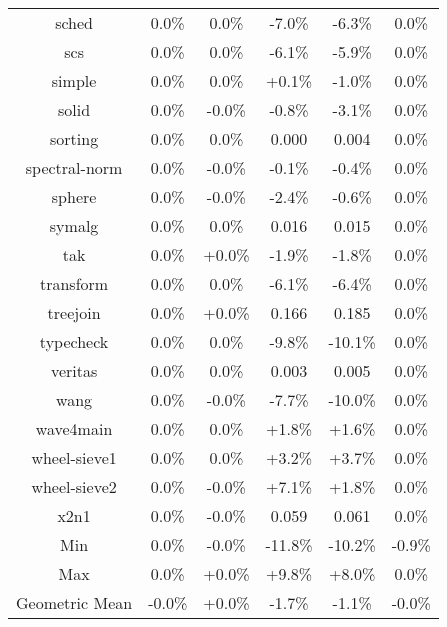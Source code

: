 \begin{tabular}{ c c c c c c }
sched &  0.0\% &  0.0\% & -7.0\% & -6.3\% &  0.0\%\\
scs &  0.0\% &  0.0\% & -6.1\% & -5.9\% &  0.0\%\\
simple &  0.0\% &  0.0\% & +0.1\% & -1.0\% &  0.0\%\\
solid &  0.0\% & -0.0\% & -0.8\% & -3.1\% &  0.0\%\\
sorting &  0.0\% &  0.0\% & 0.000 & 0.004 &  0.0\%\\
spectral-norm &  0.0\% & -0.0\% & -0.1\% & -0.4\% &  0.0\%\\
sphere &  0.0\% & -0.0\% & -2.4\% & -0.6\% &  0.0\%\\
symalg &  0.0\% &  0.0\% & 0.016 & 0.015 &  0.0\%\\
tak &  0.0\% & +0.0\% & -1.9\% & -1.8\% &  0.0\%\\
transform &  0.0\% &  0.0\% & -6.1\% & -6.4\% &  0.0\%\\
treejoin &  0.0\% & +0.0\% & 0.166 & 0.185 &  0.0\%\\
typecheck &  0.0\% &  0.0\% & -9.8\% & -10.1\% &  0.0\%\\
veritas &  0.0\% &  0.0\% & 0.003 & 0.005 &  0.0\%\\
wang &  0.0\% & -0.0\% & -7.7\% & -10.0\% &  0.0\%\\
wave4main &  0.0\% &  0.0\% & +1.8\% & +1.6\% &  0.0\%\\
wheel-sieve1 &  0.0\% &  0.0\% & +3.2\% & +3.7\% &  0.0\%\\
wheel-sieve2 &  0.0\% & -0.0\% & +7.1\% & +1.8\% &  0.0\%\\
x2n1 &  0.0\% & -0.0\% & 0.059 & 0.061 &  0.0\%\\
\hline
Min &  0.0\% & -0.0\% & -11.8\% & -10.2\% & -0.9\%\\
Max &  0.0\% & +0.0\% & +9.8\% & +8.0\% &  0.0\%\\
Geometric Mean & -0.0\% & +0.0\% & -1.7\% & -1.1\% & -0.0\%\\


\end{tabular}
